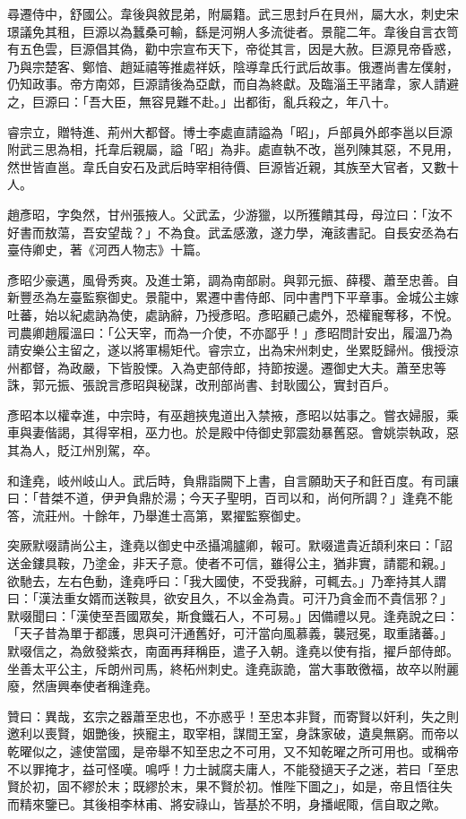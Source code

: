 \begin{pinyinscope}
 尋遷侍中，舒國公。韋後與敘昆弟，附屬籍。武三思封戶在貝州，屬大水，刺史宋璟議免其租，巨源以為蠶桑可輸，繇是河朔人多流徙者。景龍二年。韋後自言衣笥有五色雲，巨源倡其偽，勸中宗宣布天下，帝從其言，因是大赦。巨源見帝昏惑，乃與宗楚客、鄭愔、趙延禧等推處祥妖，陰導韋氏行武后故事。俄遷尚書左僕射，仍知政事。帝方南郊，巨源請後為亞獻，而自為終獻。及臨淄王平諸韋，家人請避之，巨源曰：「吾大臣，無容見難不赴。」出都街，亂兵殺之，年八十。



 睿宗立，贈特進、荊州大都督。博士李處直請謚為「昭」，戶部員外郎李邕以巨源附武三思為相，托韋后親屬，謚「昭」為非。處直執不改，邕列陳其惡，不見用，然世皆直邕。韋氏自安石及武后時宰相待價、巨源皆近親，其族至大官者，又數十人。



 趙彥昭，字奐然，甘州張掖人。父武孟，少游獵，以所獲饋其母，母泣曰：「汝不好書而敖蕩，吾安望哉？」不為食。武孟感激，遂力學，淹該書記。自長安丞為右臺侍卿史，著《河西人物志》十篇。



 彥昭少豪邁，風骨秀爽。及進士第，調為南部尉。與郭元振、薛稷、蕭至忠善。自新豐丞為左臺監察御史。景龍中，累遷中書侍郎、同中書門下平章事。金城公主嫁吐蕃，始以紀處訥為使，處訥辭，乃授彥昭。彥昭顧己處外，恐權寵奪移，不悅。司農卿趙履溫曰：「公天宰，而為一介使，不亦鄙乎！」彥昭問計安出，履溫乃為請安樂公主留之，遂以將軍楊矩代。睿宗立，出為宋州刺史，坐累貶歸州。俄授涼州都督，為政嚴，下皆股慄。入為吏部侍郎，持節按邊。遷御史大夫。蕭至忠等誅，郭元振、張說言彥昭與秘謀，改刑部尚書、封耿國公，實封百戶。



 彥昭本以權幸進，中宗時，有巫趙挾鬼道出入禁掖，彥昭以姑事之。嘗衣婦服，乘車與妻偕謁，其得宰相，巫力也。於是殿中侍御史郭震劾暴舊惡。會姚崇執政，惡其為人，貶江州別駕，卒。



 和逢堯，岐州岐山人。武后時，負鼎詣闕下上書，自言願助天子和飪百度。有司讓曰：「昔桀不道，伊尹負鼎於湯；今天子聖明，百司以和，尚何所調？」逢堯不能答，流莊州。十餘年，乃舉進士高第，累擢監察御史。



 突厥默啜請尚公主，逢堯以御史中丞攝鴻臚卿，報可。默啜遣貴近頡利來曰：「詔送金鏤具鞍，乃塗金，非天子意。使者不可信，雖得公主，猶非實，請罷和親。」欲馳去，左右色動，逢堯呼曰：「我大國使，不受我辭，可輒去。」乃牽持其人謂曰：「漢法重女婿而送鞍具，欲安且久，不以金為貴。可汗乃貪金而不貴信邪？」默啜聞曰：「漢使至吾國眾矣，斯食鐵石人，不可易。」因備禮以見。逢堯說之曰：「天子昔為單于都護，思與可汗通舊好，可汗當向風慕義，襲冠冕，取重諸蕃。」默啜信之，為斂發紫衣，南面再拜稱臣，遣子入朝。逢堯以使有指，擢戶部侍郎。坐善太平公主，斥朗州司馬，終柘州刺史。逢堯詼詭，當大事敢徼福，故卒以附麗廢，然唐興奉使者稱逢堯。



 贊曰：異哉，玄宗之器蕭至忠也，不亦惑乎！至忠本非賢，而寄賢以奸利，失之則邀利以喪賢，姻艷後，挾寵主，取宰相，謀間王室，身誅家破，遺臭無窮。而帝以乾曜似之，遽使當國，是帝舉不知至忠之不可用，又不知乾曜之所可用也。或稱帝不以罪掩才，益可怪嘆。鳴呼！力士誠腐夫庸人，不能發擿天子之迷，若曰「至忠賢於初，固不繆於末；既繆於末，果不賢於初。惟陛下圖之」，如是，帝且悟往失而精來鑒已。其後相李林甫、將安祿山，皆基於不明，身播岷陬，信自取之歟。



\end{pinyinscope}